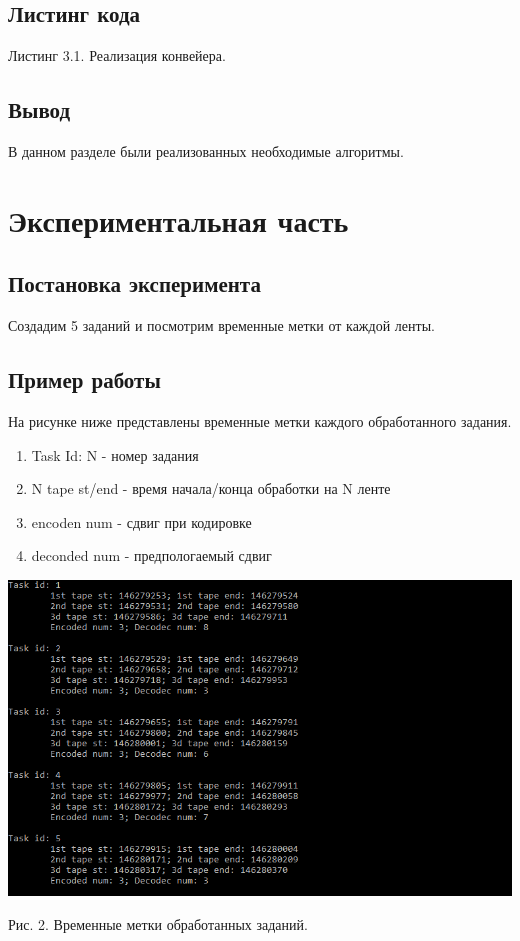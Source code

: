 \documentclass[12pt]{report}
\begin{document}
	\section{Листинг кода}
	
	Листинг 3.1. Реализация конвейера.
	
	
	\section*{Вывод}
	
	В данном разделе были реализованных необходимые алгоритмы.
	
	\chapter{Экспериментальная часть}
	
	\section{Постановка эксперимента}

	Создадим 5 заданий и посмотрим временные метки от каждой ленты.
	
	\section{Пример работы}
	
	На рисунке ниже представлены временные метки каждого обработанного задания.
	\begin{enumerate}
	\item Task Id: N - номер задания
	\item N tape st/end - время начала/конца обработки на N ленте
	\item encoden num - сдвиг при кодировке
	\item deconded num - предпологаемый сдвиг
	\end{enumerate}

	\begin{center}
		\includegraphics[scale=0.8]{exp.png}
		
		Рис. 2. Временные метки обработанных заданий.
	\end{center}
\end{document}
